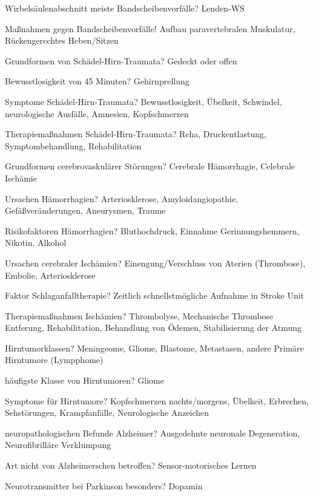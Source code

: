 \documentclass[a4paper]{article}
\begin{document}
\begin{multicols}{3}
  Wirbelsäulenabschnitt meiste Bandscheibenvorfälle? Lenden-WS

  Maßnahmen gegen Bandscheibenvorfälle! Aufbau paravertebralen Muskulatur, Rückengerechtes Heben/Sitzen%

  Grundformen von Schädel-Hirn-Traumata? Gedeckt oder offen

  Bewusstlosigkeit von 45 Minuten? Gehirnprellung

  Symptome Schädel-Hirn-Traumata? Bewusstlosigkeit, Übelkeit, Schwindel, neurologische Ausfälle, Amnesien, Kopfschmerzen

  Therapiemaßnahmen Schädel-Hirn-Traumata? Reha, Druckentlastung, Symptombehandlung, Rehabilitation

  Grundformen cerebrovaskulärer Störungen? Cerebrale Hämorrhagie, Celebrale Ischämie

  Ursachen Hämorrhagien? Arteriosklerose, Amyloidangiopathie, Gefäßveränderungen, Aneurysmen, Traume

  Risikofaktoren Hämorrhagien? Bluthochdruck, Einnahme Gerinnungshemmern, Nikotin, Alkohol

  Ursachen cerebraler Ischämien? Einengung/Verschluss von Aterien (Thrombose), Embolie, Arteriosklerose

  Faktor Schlaganfalltherapie? Zeitlich schnellstmögliche Aufnahme in Stroke Unit

  Therapiemaßnahmen Ischämien? Thrombolyse, Mechanische Thrombose Entferung, Rehabilitation, Behandlung von Ödemen, Stabilisierung der Atmung

  Hirntumorklassen? Meningeome, Gliome, Blastome, Metastasen, andere Primäre Hirntumore (Lympphome)

  häufigste Klasse von Hirntumoren? Gliome

  Symptome für Hirntumore? Kopfschmerzen nachts/morgens, Übelkeit, Erbrechen, Sehstörungen, Krampfanfälle, Neurologische Anzeichen %

  neuropathologischen Befunde Alzheimer? Ausgedehnte neuronale Degeneration, Neurofibrilläre Verklumpung


  Art nicht von Alzheimerschen betroffen? Sensor-motorisches Lernen

  Neurotransmitter bei Parkinson besonders? Dopamin


\end{multicols}
\end{document}
